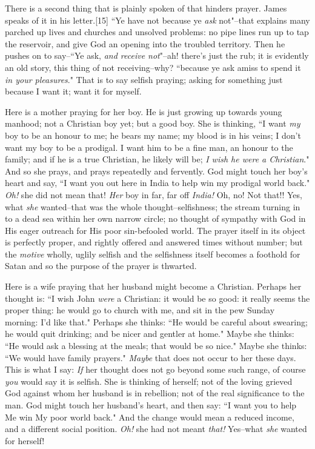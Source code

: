 There is a second thing that is plainly spoken of that hinders prayer.
James speaks of it in his letter.[15] ``Ye have not because ye \textit{ask}
not"--that explains many parched up lives and churches and unsolved
problems: no pipe lines run up to tap the reservoir, and give God an
opening into the troubled territory. Then he pushes on to say--``Ye ask,
\textit{and receive not}"--ah! there's just the rub; it is evidently an old
story, this thing of not receiving--why? ``because ye ask amiss to spend it
\textit{in your pleasures}." That is to say selfish praying; asking for something
just because I want it; want it for myself.

Here is a mother praying for her boy. He is just growing up towards young
manhood; not a Christian boy yet; but a good boy. She is thinking, ``I want
\textit{my} boy to be an honour to me; he bears my name; my blood is in his
veins; I don't want my boy to be a prodigal. I want him to be a fine man,
an honour to the family; and if he is a true Christian, he likely will be;
\textit{I wish he were a Christian}." And so she prays, and prays repeatedly and
fervently. God might touch her boy's heart and say, ``I want you out here
in India to help win my prodigal world back." \textit{Oh!} she did not mean that!
\textit{Her} boy in far, far off \textit{India!} Oh, no! Not that!! Yes, what \textit{she}
wanted--that was the whole thought--selfishness; the stream turning in to
a dead sea within her own narrow circle; no thought of sympathy with God
in His eager outreach for His poor sin-befooled world. The prayer itself
in its object is perfectly proper, and rightly offered and answered times
without number; but the \textit{motive} wholly, uglily selfish and the
selfishness itself becomes a foothold for Satan and so the purpose of the
prayer is thwarted.

Here is a wife praying that her husband might become a Christian. Perhaps
her thought is: ``I wish John \textit{were} a Christian: it would be so good: it
really seems the proper thing: he would go to church with me, and sit in
the pew Sunday morning: I'd like that." Perhaps she thinks: ``He would be
careful about swearing; he would quit drinking; and be nicer and gentler
at home." Maybe she thinks: ``He would ask a blessing at the meals; that
would be so nice." Maybe she thinks: ``We would have family prayers."
\textit{Maybe} that does not occur to her these days. This is what I say: \textit{If}
her thought does not go beyond some such range, of course \textit{you} would say
it is selfish. She is thinking of herself; not of the loving grieved God
against whom her husband is in rebellion; not of the real significance to
the man. God might touch her husband's heart, and then say: ``I want you to
help Me win My poor world back." And the change would mean a reduced
income, and a different social position. \textit{Oh!} she had not meant \textit{that!}
Yes--what \textit{she} wanted for herself!

